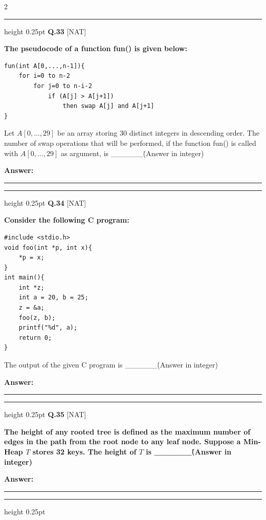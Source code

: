 \documentclass[a4paper,10pt,twoside]{article}
\begin{document}
\begin{multicols}{2}
\par\vspace{6pt}\hrule height 0.25pt\vspace{6pt}
\noindent\textbf{Q.33} \hfill {\footnotesize\textsf{[NAT]}}
\par\vspace{2pt}
{\bfseries The pseudocode of a function fun() is given below:
\begin{verbatim}
fun(int A[0,...,n-1]){
    for i=0 to n-2
        for j=0 to n-i-2
            if (A[j] > A[j+1])
                then swap A[j] and A[j+1]
}
\end{verbatim}
Let $A[0, \ldots, 29]$ be an array storing 30 distinct integers in descending order. The number of swap operations that will be performed, if the function fun() is called with $A[0, \ldots, 29]$ as argument, is \_\_\_\_\_\_\. (Answer in integer) \par}
\par\vspace{3pt}\noindent\textbf{Answer:} \rule{3.2cm}{0.4pt}
\par\vspace{6pt}\hrule height 0.25pt\vspace{6pt}
\noindent\textbf{Q.34} \hfill {\footnotesize\textsf{[NAT]}}
\par\vspace{2pt}
{\bfseries Consider the following C program:
\par\smallskip
\begin{verbatim}
#include <stdio.h>
void foo(int *p, int x){
    *p = x;
}
int main(){
    int *z;
    int a = 20, b = 25;
    z = &a;
    foo(z, b);
    printf("%d", a);
    return 0;
}
\end{verbatim}
The output of the given C program is \_\_\_\_\_\_\. (Answer in integer) \par}
\par\vspace{3pt}\noindent\textbf{Answer:} \rule{3.2cm}{0.4pt}
\par\vspace{6pt}\hrule height 0.25pt\vspace{6pt}
\noindent\textbf{Q.35} \hfill {\footnotesize\textsf{[NAT]}}
\par\vspace{2pt}
{\bfseries The height of any rooted tree is defined as the maximum number of edges in the path from the root node to any leaf node. Suppose a Min-Heap $T$ stores 32 keys. The height of $T$ is \_\_\_\_\_\_\. (Answer in integer) \par}
\par\vspace{3pt}\noindent\textbf{Answer:} \rule{3.2cm}{0.4pt}
\par\vspace{6pt}\hrule height 0.25pt\vspace{6pt}


\end{multicols}
\end{document}
